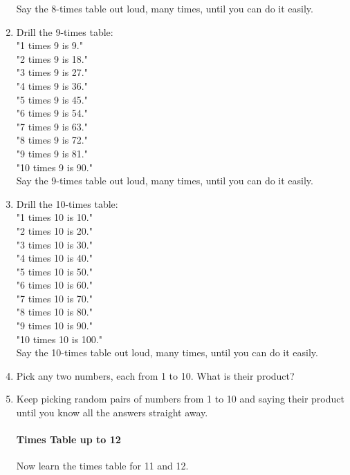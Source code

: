 \documentclass[12pt]{article}
\begin{document}
\begin{enumerate}
Say the 8-times table out loud, many times, until you can do it easily.\\

\item Drill the 9-times table:\\

"1 times 9 is 9."\\
"2 times 9 is 18."\\
"3 times 9 is 27."\\
"4 times 9 is 36."\\
"5 times 9 is 45."\\
"6 times 9 is 54."\\
"7 times 9 is 63."\\
"8 times 9 is 72."\\
"9 times 9 is 81."\\
"10 times 9 is 90."\\

Say the 9-times table out loud, many times, until you can do it easily.\\

\item Drill the 10-times table:\\

"1 times 10 is 10."\\
"2 times 10 is 20."\\
"3 times 10 is 30."\\
"4 times 10 is 40."\\
"5 times 10 is 50."\\
"6 times 10 is 60."\\
"7 times 10 is 70."\\
"8 times 10 is 80."\\
"9 times 10 is 90."\\
"10 times 10 is 100."\\

Say the 10-times table out loud, many times, until you can do it easily.\\

\item Pick any two numbers, each  from 1 to 10. What is their product?
\item Keep picking random pairs of numbers from 1 to 10 and saying their product until you know all the answers straight away.

\pagebreak

\paragraph{Times Table up to 12}
Now learn the times table for 11 and 12.\\


\end{enumerate}
\end{document}
